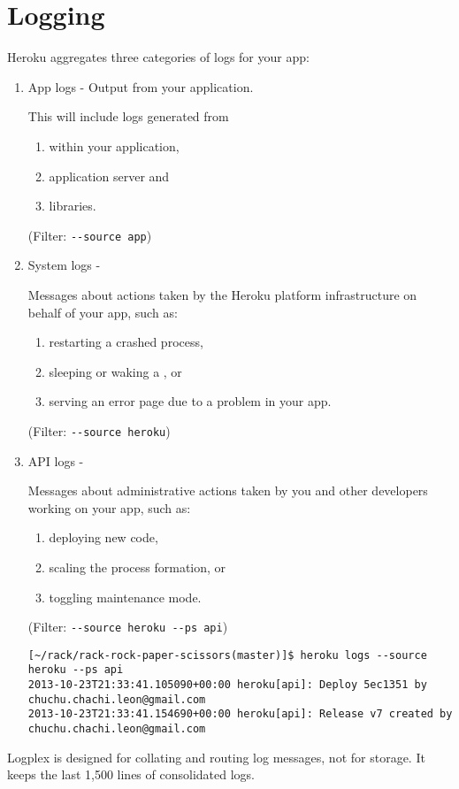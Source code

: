 \section{Logging}
Heroku aggregates three categories of logs for your app:
\begin{enumerate}
\item 
App logs - Output from your application. 

This will include logs
generated from 
\begin{enumerate}
\item 
within your application, 
\item 
application server and
\item 
libraries. 
\end{enumerate}
(Filter: \verb|--source app|)
\item 
System logs - 

Messages about actions taken by the Heroku platform
infrastructure on behalf of your app, such as: 
\begin{enumerate}
\item 
restarting a crashed process, 
\item 
sleeping or waking a , or 
\item 
serving an error page
due to a problem in your app. 
\end{enumerate}
(Filter: \verb|--source heroku|)
\item 
API logs - 

Messages about administrative actions taken by you and
other developers working on your app, such as: 

\begin{enumerate}
\item 
deploying new code,
\item 
scaling the process formation, or 
\item 
toggling maintenance mode. 
\end{enumerate}
(Filter: \verb|--source heroku --ps api|)

\begin{verbatim}
[~/rack/rack-rock-paper-scissors(master)]$ heroku logs --source heroku --ps api
2013-10-23T21:33:41.105090+00:00 heroku[api]: Deploy 5ec1351 by chuchu.chachi.leon@gmail.com
2013-10-23T21:33:41.154690+00:00 heroku[api]: Release v7 created by chuchu.chachi.leon@gmail.com
\end{verbatim}
\end{enumerate}

Logplex is designed for collating and routing log messages, not for
storage. It keeps the last 1,500 lines of consolidated logs. 

